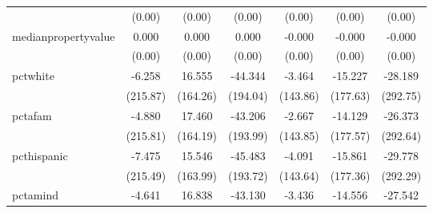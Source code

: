 {\begin{tabular}{l*{6}{c}}
            &                   (0.00)         &                   (0.00)         &                   (0.00)         &                   (0.00)         &                   (0.00)         &                   (0.00)         \\
medianpropertyvalue&                    0.000         &                    0.000         &                    0.000         &                   -0.000         &                   -0.000         &                   -0.000         \\
            &                   (0.00)         &                   (0.00)         &                   (0.00)         &                   (0.00)         &                   (0.00)         &                   (0.00)         \\
pctwhite    &                   -6.258         &                   16.555         &                  -44.344         &                   -3.464         &                  -15.227         &                  -28.189         \\
            &                 (215.87)         &                 (164.26)         &                 (194.04)         &                 (143.86)         &                 (177.63)         &                 (292.75)         \\
pctafam     &                   -4.880         &                   17.460         &                  -43.206         &                   -2.667         &                  -14.129         &                  -26.373         \\
            &                 (215.81)         &                 (164.19)         &                 (193.99)         &                 (143.85)         &                 (177.57)         &                 (292.64)         \\
pcthispanic &                   -7.475         &                   15.546         &                  -45.483         &                   -4.091         &                  -15.861         &                  -29.778         \\
            &                 (215.49)         &                 (163.99)         &                 (193.72)         &                 (143.64)         &                 (177.36)         &                 (292.29)         \\
pctamind    &                   -4.641         &                   16.838         &                  -43.130         &                   -3.436         &                  -14.556         &                  -27.542         \\

\end{tabular}}

